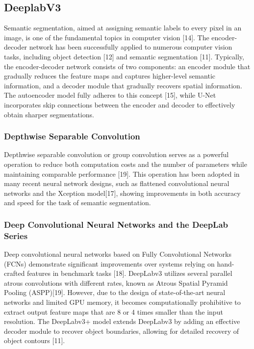 \documentclass[conference]{IEEEtran}
\begin{document}
\subsection{DeeplabV3}
Semantic segmentation, aimed at assigning semantic labels to every pixel in an image, is one of the fundamental topics in computer vision [14]. The encoder-decoder network has been successfully applied to numerous computer vision tasks, including object detection [12] and semantic segmentation [11]. Typically, the encoder-decoder network consists of two components: an encoder module that gradually reduces the feature maps and captures higher-level semantic information, and a decoder module that gradually recovers spatial information. The autoencoder model fully adheres to this concept [15], while U-Net incorporates skip connections between the encoder and decoder to effectively obtain sharper segmentations.

\subsubsection{Depthwise Separable Convolution}
Depthwise separable convolution or group convolution serves as a powerful operation to reduce both computation costs and the number of parameters while maintaining comparable performance [19]. This operation has been adopted in many recent neural network designs, such as flattened convolutional neural networks and the Xception model[17], showing improvements in both accuracy and speed for the task of semantic segmentation.

\subsubsection{Deep Convolutional Neural Networks and the DeepLab Series}
Deep convolutional neural networks based on Fully Convolutional Networks (FCNs) demonstrate significant improvements over systems relying on hand-crafted features in benchmark tasks [18]. DeepLabv3 utilizes several parallel atrous convolutions with different rates, known as Atrous Spatial Pyramid Pooling (ASPP)[19]. However, due to the design of state-of-the-art neural networks and limited GPU memory, it becomes computationally prohibitive to extract output feature maps that are 8 or 4 times smaller than the input resolution. The DeepLabv3+ model extends DeepLabv3 by adding an effective decoder module to recover object boundaries, allowing for detailed recovery of object contours [11].
\end{document}
